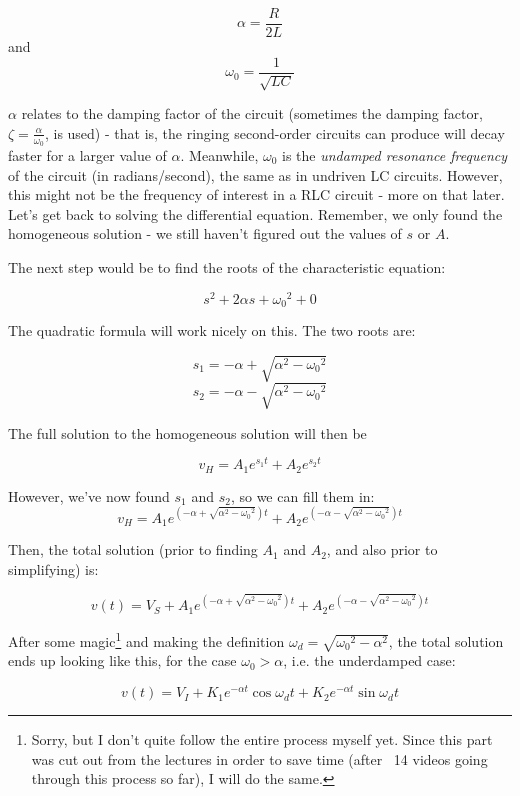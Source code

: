 \documentclass[12pt,a4paper]{report}
\begin{document}
\[ \alpha = \frac{R}{2L} \]
and
\[ \omega_0 = \frac{1}{\sqrt{LC}} \]

$\alpha$ relates to the damping factor of the circuit (sometimes the damping factor, $\displaystyle \zeta = \frac{\alpha}{\omega_0}$, is used) - that is, the ringing second-order circuits can produce will decay faster for a larger value of $\alpha$. Meanwhile, $\omega_0$ is the \emph{undamped resonance frequency} of the circuit (in radians/second), the same as in undriven LC circuits. However, this might not be the frequency of interest in a RLC circuit - more on that later.\\

Let's get back to solving the differential equation. Remember, we only found the homogeneous solution - we still haven't figured out the values of $s$ or $A$.

The next step would be to find the roots of the characteristic equation:

\[ s^2 + 2\alpha s + {\omega_0}^2 + 0 \]

The quadratic formula will work nicely on this. The two roots are:

\[ s_1 = -\alpha + \sqrt{\alpha^2 - {\omega_0}^2} \]
\[ s_2 = -\alpha - \sqrt{\alpha^2 - {\omega_0}^2} \]

The full solution to the homogeneous solution will then be

\[ v_H = A_1 e^{s_1 t} + A_2 e^{s_2 t} \]

However, we've now found $s_1$ and $s_2$, so we can fill them in:
\large
\[ v_H = A_1 e^{(-\alpha + \sqrt{\alpha^2 - {\omega_0}^2}) t} + A_2 e^{(-\alpha - \sqrt{\alpha^2 - {\omega_0}^2}) t} \]
\normalsize

Then, the total solution (prior to finding $A_1$ and $A_2$, and also prior to simplifying) is:

\[ v(t) = V_S + A_1 e^{(-\alpha + \sqrt{\alpha^2 - {\omega_0}^2}) t} + A_2 e^{(-\alpha - \sqrt{\alpha^2 - {\omega_0}^2}) t} \]

After some magic\footnote{Sorry, but I don't quite follow the entire process myself yet. Since this part was cut out from the lectures in order to save time (after ~14 videos going through this process so far), I will do the same.} and making the definition $\omega_d = \sqrt{{\omega_0}^2 - \alpha^2}$, the total solution ends up looking like this, for the case $\omega_0 > \alpha$, i.e. the underdamped case:

\[ v(t) = V_I + K_1 e^{-\alpha t} \cos{\omega_d t} + K_2 e^{-\alpha t} \sin{\omega_d t} \]
\end{document}
